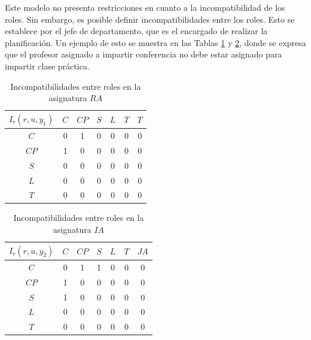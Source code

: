 

Este modelo no presenta restricciones en cuanto a la incompatibilidad de los roles. Sin embargo, es posible definir incompatibilidades entre los roles. Esto se establece por el jefe de departamento, que es el encargado de realizar la planificación. Un ejemplo de esto se muestra en las Tablas \ref{ier1-carga} y \ref{ier2-carga}, donde se expresa que el profesor asignado a impartir conferencia no debe estar asignado para impartir clase práctica.

\begin{table}[H]
	\centering
	\caption{Incompatibilidades entre roles en la asignatura $RA$}\label{ier1-carga}
	\begin{tabular}{|c|c|c|c|c|c|c|}
		\hline
		$I_r(r,u,y_1)$  & $C$ & $CP$& $S$ & $L$ & $T$ & $T$  \\ \hline
		$C$  	   		&  0  &  1  &  0  &  0  & 0 & 0	\\ \hline
		$CP$ 	   		&  1  &  0  &  0  &  0  & 0 & 0	\\ \hline
		$S$  	   		&  0  &  0  &  0  &  0  & 0 & 0	\\ \hline
		$L$  	   		&  0  &  0  &  0  &  0  & 0 & 0	\\ \hline
		$T$  	   		&  0  &  0  &  0  &  0  & 0 & 0	\\ \hline
	\end{tabular}
\end{table}

\begin{table}[H]
	\centering
	\caption{Incompatibilidades entre roles en la asignatura $IA$}\label{ier2-carga}
	\begin{tabular}{|c|c|c|c|c|c|c|}
		\hline
		$I_r(r,u,y_2)$  & $C$ & $CP$& $S$ & $L$ & $T$ & $JA$   \\ \hline
		$C$  	   		&  0  &  1  &  1  &  0  & 0 & 0	\\ \hline
		$CP$ 	   		&  1  &  0  &  0  &  0  & 0 & 0	\\ \hline
		$S$  	   		&  1  &  0  &  0  &  0  & 0 & 0	\\ \hline
		$L$  	   		&  0  &  0  &  0  &  0  & 0 & 0	\\ \hline
		$T$  	   		&  0  &  0  &  0  &  0  & 0 & 0	\\ \hline
	\end{tabular}
\end{table}

